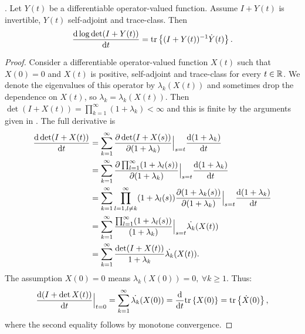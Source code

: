 \documentclass[review,supplement,hidelinks,onefignum,onetabnum]{siamart220329}
\begin{document}
\begin{lemma}.\label{lemma:lax}
  Let $Y(t)$ be a differentiable operator-valued function. Assume 
  $I+Y(t)$ is invertible, $Y(t)$ self-adjoint and trace-class. Then
  \begin{equation*}
    \frac{\text{\textup{d}} \log \det (I+Y(t))}{\text{\textup{d}} t} = \textup{tr}\left \{(I+Y(t))^{-1} \dot{Y}(t) \right \}.
  \end{equation*}
\end{lemma}

\begin{proof}
  Consider a differentiable operator-valued function $X(t)$ such that
  $X(0) = 0$ and $X(t)$ is positive, self-adjoint and trace-class for
  every $t\in \mathbb{R}$. We denote the eigenvalues of this operator by
  $\lambda_k(X(t))$ and sometimes drop the dependence on $X(t)$, so
  $\lambda_k = \lambda_k(X(t))$.  Then $\det (I+X(t))
  = \prod_{k=1}^{\infty} (1+\lambda_k) < \infty$ and this is finite by
  the arguments given in \cite{AlexanderianGloorGhattas14}. The full
  derivative is \begin{align*} \frac{\text{\textup{d}} \det (I+X(t))}{\text{\textup{d}} t}
    &= \sum_{k=1}^{\infty} 
    \frac{\partial \det (I+X(s))}{\partial (1+\lambda_k)}\Big |_{s=t}
    \frac{\text{\textup{d}} (1+\lambda_k)}{\text{\textup{d}} t} \\
    &= \sum_{k=1}^{\infty} \frac{\partial \prod_{l=1}^{\infty}
      (1+\lambda_l(s))}{\partial (1+\lambda_k)}\Big |_{s=t}
    \frac{\text{\textup{d}} (1+\lambda_k)}{\text{\textup{d}} t} \\
    &= \sum_{k=1}^{\infty} \prod_{l=1, l\neq k}^{\infty}
      (1+\lambda_l(s)) \frac{\partial (1+\lambda_k(s))}{\partial (1+\lambda_k)}\Big |_{s=t}
    \frac{\text{\textup{d}} (1+\lambda_k)}{\text{\textup{d}} t} \\
    &= \sum_{k=1}^{\infty} \frac{\prod_{l=1}^{\infty}
      (1+\lambda_l(s))}{(1+\lambda_k)}\Big |_{s=t}
    \dot{\lambda_k}(X(t)) \\
    &= \sum_{k=1}^{\infty} \frac{\det (I+X(t))}{1 +\lambda_k} \dot{\lambda_k}(X(t)).
  \end{align*}
  The assumption $X(0) = 0$ means $\lambda_k(X(0)) = 0,\ \forall k \geq 1$. Thus:
  \begin{align*}
    \frac{\text{\textup{d}} (I+\det X(t))}{\text{\textup{d}} t}\Big |_{t=0} 
    = \sum_{k=1}^{\infty} \dot{\lambda_k}(X(0)) 
    = \frac{\text{\textup{d}} }{\text{\textup{d}} t}\textup{tr}\left \{X(0) \right \}
    = \textup{tr}\left \{\dot{X}(0) \right \},
  \end{align*}
  where the second equality follows by monotone convergence. 

\end{proof}
\end{document}
